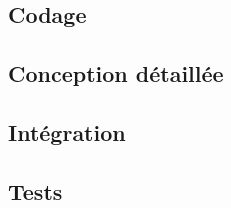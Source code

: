 \textcolor[RGB]{46, 116, 181}{\chapter{Codage}}

\section{Conception détaillée}













\section{Intégration}

\section{Tests}
